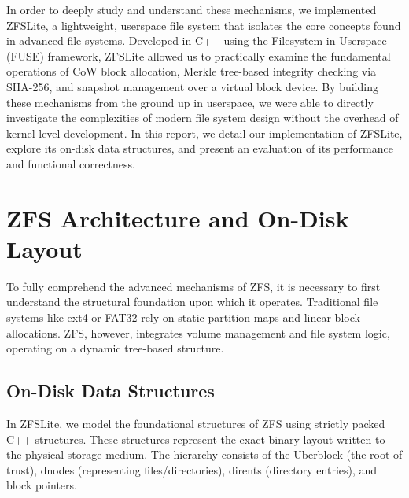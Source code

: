 \documentclass[pdflatex,sn-mathphys-num]{sn-jnl}
\begin{document}
In order to deeply study and understand these mechanisms, we implemented ZFSLite, a lightweight, userspace file system that isolates the core concepts found in advanced file systems. Developed in C++ using the Filesystem in Userspace (FUSE) framework, ZFSLite allowed us to practically examine the fundamental operations of CoW block allocation, Merkle tree-based integrity checking via SHA-256, and snapshot management over a virtual block device. By building these mechanisms from the ground up in userspace, we were able to directly investigate the complexities of modern file system design without the overhead of kernel-level development. In this report, we detail our implementation of ZFSLite, explore its on-disk data structures, and present an evaluation of its performance and functional correctness.



\section{ZFS Architecture and On-Disk Layout}\label{sec:arch}

To fully comprehend the advanced mechanisms of ZFS, it is necessary to first understand the structural foundation upon which it operates. Traditional file systems like ext4 or FAT32 rely on static partition maps and linear block allocations. ZFS, however, integrates volume management and file system logic, operating on a dynamic tree-based structure.


\subsection{On-Disk Data Structures}

In ZFSLite, we model the foundational structures of ZFS using strictly packed C++ structures. These structures represent the exact binary layout written to the physical storage medium. The hierarchy consists of the Uberblock (the root of trust), dnodes (representing files/directories), dirents (directory entries), and block pointers.
\end{document}
